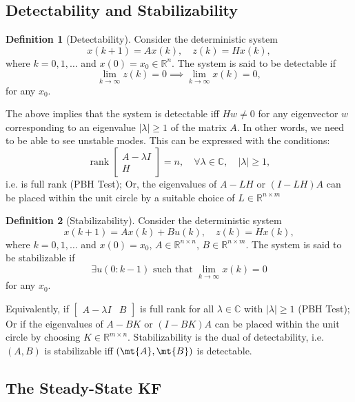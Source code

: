 \documentclass[]{hsrzf}
\theoremstyle{plain}
\theoremstyle{definition}
\newtheorem{defn}{Definition}[section]
\theoremstyle{remark}
\DeclareMathOperator{\rank}{rank}
\begin{document}
\subsection{Detectability and Stabilizability}

\begin{defn}[Detectability]
  Consider the deterministic system
  \[
    x(k+1) = Ax(k), \quad
    z(k) = Hx(k),
  \]
  where $k = 0, 1, \ldots $ and $x(0) = x_0 \in \mathbb{R}^n$. The system is
  said to be detectable if
  \[
    \lim_{k\to\infty} z(k) = 0 \implies \lim_{k\to\infty} x(k) = 0,
  \]
  for any $x_0$.
\end{defn}

The above implies that the system is detectable iff $Hw \neq 0$ for any
eigenvector $w$ corresponding to an eigenvalue $|\lambda| \geq 1$ of the matrix
$A$. In other words, we need to be able to see unstable modes. This can be
expressed with the conditions:
\[
  \rank \begin{bmatrix}
    A - \lambda I \\
    H
  \end{bmatrix} = n, 
  \quad \forall \lambda \in \mathbb{C},
  \quad |\lambda| \geq 1,
\]
i.e. is full rank (PBH Test); Or, the eigenvalues of $A - LH$ or $(I - LH)A$
can be placed within the unit circle by a suitable choice of
$L\in\mathbb{R}^{n\times m}$

\begin{defn}[Stabilizability]
  Consider the deterministic system
  \[
    x(k+1) = Ax(k) + Bu(k), \quad
    z(k) = Hx(k),
  \]
  where $k = 0, 1, \ldots $ and $x(0) = x_0$, $A \in \mathbb{R}^{n\times n}$,
  $B \in\mathbb{R}^{n\times m}$. The system is said to be stabilizable if
  \[
    \exists u(0:k-1) \text{ such that } \lim_{k\to\infty} x(k) = 0
  \]
  for any $x_0$.
\end{defn}
Equivalently, if $\begin{bmatrix} A - \lambda I & B \end{bmatrix}$ is full
rank for all $\lambda \in \mathbb{C}$ with $|\lambda| \geq 1$ (PBH Test); Or
if the eigenvalues of $A - BK$ or $(I - BK)A$ can be placed within the unit
circle by choosing $K\in \mathbb{R}^{m\times n}$. Stabilizability is the dual
of detectability, i.e. $(A, B)$ is stabilizable iff $(\mt{A}, \mt{B})$ is
detectable.


\subsection{The Steady-State KF}
\end{document}
